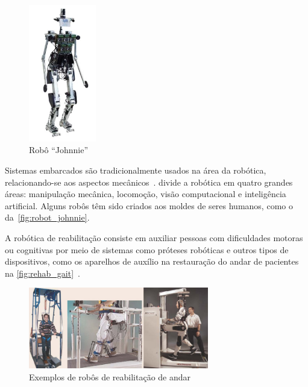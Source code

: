 \begin{figure}[!ht]
	\caption{\label{fig:robot_johnnie}Robô ``Johnnie''}
	\begin{center}
	    \includegraphics[height=6cm]{resources/robotics_robot_marwedel}
	\end{center}
\end{figure}

Sistemas embarcados são tradicionalmente usados na área da robótica, relacionando-se aos aspectos mecânicos~\cite{marwedel:2010}.  divide a robótica em quatro grandes áreas: manipulação mecânica, locomoção, visão computacional e inteligência artificial. Alguns robôs têm sido criados aos moldes de seres humanos, como o da~\autoref{fig:robot_johnnie}.

A robótica de reabilitação consiste em auxiliar pessoas com dificuldades motoras ou cognitivas por meio de sistemas como próteses robóticas e outros tipos de dispositivos, como os aparelhos de auxílio na restauração do andar de pacientes na \autoref{fig:rehab_gait}~\cite{siciliano:2008springer}. 

\begin{figure}[ht]
	\caption{\label{fig:rehab_gait}Exemplos de robôs de reabilitação de andar}
	\begin{center}
	    \includegraphics[width=0.7\textwidth]{resources/robotics_rehab_1}
	\end{center}
\end{figure}


